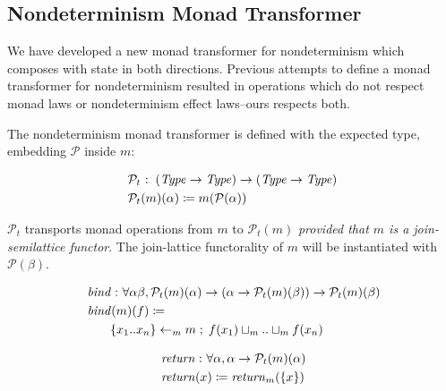 \par

\subsection{Nondeterminism Monad
Transformer}\label{nondeterminism-monad-transformer}

\par

We have developed a new monad transformer for nondeterminism which
composes with state in both directions. Previous attempts to define a
monad transformer for nondeterminism resulted in operations which do not
respect monad laws or nondeterminism effect laws--ours respects both.

\par

The nondeterminism monad transformer is defined with the expected type,
embedding $ \mathcal{P} $ inside $m$:

\small\begin{align*}
&\hspace{0em}  \mathcal{P}  _t   \mathbin{\colon}   (\operatorname{\mathit{Type}}   \rightarrow   \operatorname{\mathit{Type}})   \rightarrow   (\operatorname{\mathit{Type}}   \rightarrow   \operatorname{\mathit{Type}})  \\
&\hspace{0em}  \mathcal{P}  _t (m)( \alpha )  \coloneqq  m( \mathcal{P} ( \alpha ))
\end{align*}\normalsize

$ \mathcal{P}  _t $ transports monad operations from $m$ to
$ \mathcal{P}  _t (m)$ \emph{provided that $m$ is a join-semilattice
functor}. The join-lattice functorality of $m$ will be instantiated with
$ \mathcal{P} ( \beta )$.

\small\begin{align*}
&\hspace{0em}  \operatorname{\mathit{bind}}   \mathbin{\colon}   \forall   \alpha   \beta ,  \mathcal{P}  _t (m)( \alpha )  \rightarrow  ( \alpha   \rightarrow   \mathcal{P}  _t (m)( \beta ))  \rightarrow   \mathcal{P}  _t (m)( \beta ) \\
&\hspace{0em}  \operatorname{\mathit{bind}}( m)(f)  \coloneqq   \\
&\hspace{2em}  \{ x _1  .. x _n  \}   \leftarrow  _m  m  \;;\;  f(x _1 )  \sqcup  _m  ..  \sqcup  _m  f(x _n )
\end{align*}\normalsize

\small\begin{align*}
&\hspace{0em}  \operatorname{\mathit{return}}   \mathbin{\colon}   \forall   \alpha ,  \alpha   \rightarrow   \mathcal{P}  _t (m)( \alpha ) \\
&\hspace{0em}  \operatorname{\mathit{return}}( x)  \coloneqq   \operatorname{\mathit{return}} _m  ( \{ x \} )
\end{align*}\normalsize

